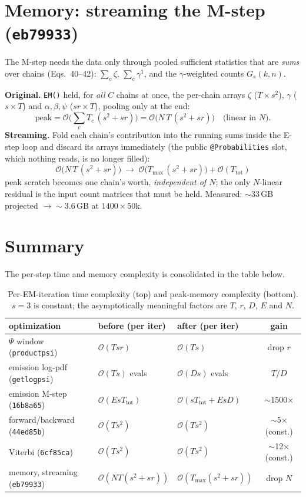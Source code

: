 \documentclass[11pt]{article}
\newcommand{\bigO}{\mathcal{O}}
\newcommand{\code}[1]{\texttt{#1}}
\begin{document}
\section{Memory: streaming the M-step (\code{eb79933})}

The M-step needs the data only through pooled sufficient statistics that are
\emph{sums} over chains (Eqs.~40--42): $\sum_c\zeta$, $\sum_c\gamma^{1}$, and the
$\gamma$-weighted counts $G_s(k,n)$.

\textbf{Original.} \code{EM()} held, for \emph{all} $C$ chains at once, the
per-chain arrays $\zeta$ ($T\!\times\!s^2$), $\gamma$ ($s\!\times\!T$) and
$\alpha,\beta,\psi$ ($s r\!\times\!T$), pooling only at the end:
\[
\text{peak} = \bigO\!\Big(\textstyle\sum_c T_c\,(s^2+s r)\Big)=\bigO\big(N\,T\,(s^2+s r)\big)\quad\text{(linear in $N$).}
\]
\textbf{Streaming.} Fold each chain's contribution into the running sums inside
the E-step loop and discard its arrays immediately (the public
\code{@Probabilities} slot, which nothing reads, is no longer filled):
\[
\boxed{\;\bigO\big(N\,T\,(s^2+s r)\big)\;\longrightarrow\;\bigO\big(T_{\max}\,(s^2+s r)\big)+\bigO(T_{\text{tot}})\;}
\]
peak scratch becomes one chain's worth, \emph{independent of $N$}; the only
$N$-linear residual is the input count matrices that must be held. Measured:
$\sim$33\,GB projected $\to\sim$3.6\,GB at $1400\times50$k.

\section{Summary}

The per-step time and memory complexity is consolidated in the table below.

\begin{table}[H]
\centering
\renewcommand{\arraystretch}{1.3}
\begin{tabular}{l l l c}
\toprule
optimization & before (per iter) & after (per iter) & gain \\
\midrule
$\Psi$ window (\code{productpsi})        & $\bigO(T s r)$            & $\bigO(T s)$                       & drop $r$ \\
emission log-pdf (\code{getlogpsi})      & $\bigO(T s)$ evals        & $\bigO(D s)$ evals                 & $T/D$ \\
emission M-step (\code{16b8a65})         & $\bigO(E s T_{\text{tot}})$ & $\bigO(s T_{\text{tot}}+E s D)$  & $\sim$1500$\times$ \\
forward/backward (\code{44ed85b})        & $\bigO(T s^2)$            & $\bigO(T s^2)$                     & $\sim$5$\times$ (const.) \\
Viterbi (\code{6cf85ca})                 & $\bigO(T s^2)$            & $\bigO(T s^2)$                     & $\sim$12$\times$ (const.) \\
\midrule
memory, streaming (\code{eb79933})       & $\bigO(N T (s^2{+}s r))$  & $\bigO(T_{\max}(s^2{+}s r))$       & drop $N$ \\
\bottomrule
\end{tabular}
\caption{Per-EM-iteration time complexity (top) and peak-memory complexity
(bottom). $s=3$ is constant; the asymptotically meaningful factors are $T$, $r$,
$D$, $E$ and $N$.}
\end{table}
\end{document}
